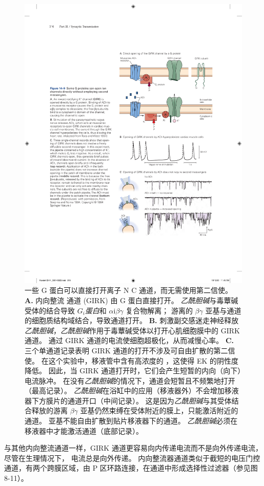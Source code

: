 \begin{figure}[htbp]
	\centering
	\includegraphics[width=0.65\linewidth]{chap14/fig_14_9}
	\caption{一些 G 蛋白可以直接打开离子 N C 通道，而无需使用第二信使。
		\textbf{A.} 内向整流  通道 (GIRK) 由 G 蛋白直接打开。
		\textit{乙酰胆碱}与毒蕈碱受体的结合导致 \textit{$G_i $蛋白}和 $\alpha$i$\beta \gamma$ 复合物解离；
		游离的 $\beta \gamma$ 亚基与通道的细胞质结构域结合，导致通道打开。
		\textbf{B.} 刺激副交感迷走神经释放\textit{乙酰胆碱}，\textit{乙酰胆碱}作用于毒蕈碱受体以打开心肌细胞膜中的 GIRK 通道。
		通过 GIRK 通道的电流使细胞超极化，从而减慢心率\cite{toda1967interactions}。
		\textbf{C.} 三个单通道记录表明 GIRK 通道的打开不涉及可自由扩散的第二信使。
		在这个实验中，移液管中含有高浓度的 ，这使得 EK 的阴性度降低。
		因此，当 GIRK 通道打开时，它们会产生短暂的内向（向下）电流脉冲。
		在没有\textit{乙酰胆碱}的情况下，通道会短暂且不频繁地打开（最高记录）。
		\textit{乙酰胆碱}在浴缸中的应用（移液器外）不会增加移液器下方膜片的通道开口（中间记录）。
		这是因为\textit{乙酰胆碱}与其受体结合释放的游离 $\beta \gamma$ 亚基仍然束缚在受体附近的膜上，只能激活附近的通道。
		亚基不能自由扩散到贴片移液器下的通道。
		\textit{乙酰胆碱}必须在移液器中才能激活通道（底部记录）\cite{soejima1984mode}。}
	\label{fig:14_9}
\end{figure}


与其他内向整流通道一样，GIRK 通道更容易向内传递电流而不是向外传递电流，尽管在生理情况下， 电流总是向外传递。
内向整流器通道类似于截短的电压门控  通道，有两个跨膜区域，由 P 区环路连接，在通道中形成选择性过滤器（参见图 8-11）。


